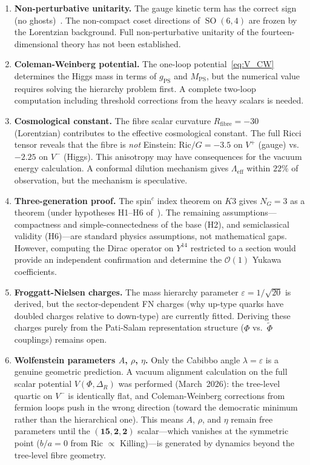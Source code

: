 \documentclass[12pt,a4paper]{article}
\theoremstyle{definition}
\newcommand{\SO}{\operatorname{SO}}
\newcommand{\MPS}{M_{\mathrm{PS}}}
\newcommand{\gPS}{g_{\mathrm{PS}}}
\begin{document}
\begin{enumerate}
\item \textbf{Non-perturbative unitarity.}
The gauge kinetic term has the correct sign (no ghosts)~\cite{Paper3}.
The non-compact coset directions of $\SO(6,4)$ are frozen by the Lorentzian background.
Full non-perturbative unitarity of the fourteen-dimensional theory has not been established.

\item \textbf{Coleman-Weinberg potential.}
The one-loop potential~\eqref{eq:V_CW} determines the Higgs mass in terms of $\gPS$ and $\MPS$, but the numerical value requires solving the hierarchy problem first.
A complete two-loop computation including threshold corrections from the heavy scalars is needed.

\item \textbf{Cosmological constant.}
The fibre scalar curvature $R_{\mathrm{fibre}} = -30$ (Lorentzian) contributes to the effective cosmological constant.
The full Ricci tensor reveals that the fibre is \emph{not} Einstein: $\mathrm{Ric}/G = -3.5$ on $V^+$ (gauge) vs.\ $-2.25$ on $V^-$ (Higgs).
This anisotropy may have consequences for the vacuum energy calculation.
A conformal dilution mechanism gives $\Lambda_{\mathrm{eff}}$ within $22\%$ of observation, but the mechanism is speculative.

\item \textbf{Three-generation proof.}
The spin$^c$ index theorem on $K3$ gives $N_G = 3$ as a theorem (under hypotheses H1--H6 of~\cite{Paper5}).
The remaining assumptions---compactness and simple-connectedness of the base (H2), and semiclassical validity (H6)---are standard physics assumptions, not mathematical gaps.
However, computing the Dirac operator on $Y^{14}$ restricted to a section would provide an independent confirmation and determine the $\mathcal{O}(1)$ Yukawa coefficients.

\item \textbf{Froggatt-Nielsen charges.}
The mass hierarchy parameter $\varepsilon = 1/\sqrt{20}$ is derived, but the sector-dependent FN charges (why up-type quarks have doubled charges relative to down-type) are currently fitted.
Deriving these charges purely from the Pati-Salam representation structure ($\Phi$ vs.\ $\tilde{\Phi}$ couplings) remains open.

\item \textbf{Wolfenstein parameters $A$, $\rho$, $\eta$.}
Only the Cabibbo angle $\lambda = \varepsilon$ is a genuine geometric prediction.
A vacuum alignment calculation on the full scalar potential $V(\Phi, \Delta_R)$ was performed (March~2026): the tree-level quartic on $V^-$ is identically flat, and Coleman-Weinberg corrections from fermion loops push in the wrong direction (toward the democratic minimum rather than the hierarchical one).
This means $A$, $\rho$, and $\eta$ remain free parameters until the $(\mathbf{15},\mathbf{2},\mathbf{2})$ scalar---which vanishes at the symmetric point ($b/a = 0$ from Ric $\propto$ Killing)---is generated by dynamics beyond the tree-level fibre geometry.


\end{enumerate}
\end{document}
